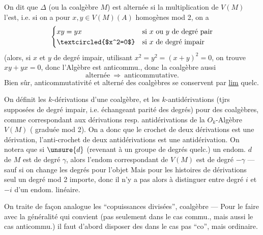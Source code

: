 On dit que $\Delta$ (ou la coalgèbre $M$) est alternée si la multiplication de $V(M)$ l'est, i.e. si on a pour  $x,y\in V(M)(A)$ homogènes mod 2, on a
\[
\begin{cases}
xy=yx&\text{si }x\text{ ou }y\text{ de degré pair}\\
\textcircled{$x^2=0$}&\text{si }x\text{ de degré impair}
\end{cases}
\]
(alors, si $x$ et $y$ de degré impair, utilisant $x^2=y^2=(x+y)^2=0$, on trouve $xy+yx=0$, donc l'Algèbre est anticommu., donc  la coalgèbre aussi
\[
\text{alternée}\ \Longrightarrow\ \text{anticommutative}.
\]
Bien sûr, anticommutativité et  alterné  des  coalgèbres se conservent par \uline{lim} quelc.

On définit les $k$-dérivations d'une coalgèbre, et les $k$-antidérivations (tjrs
supposées de degré impair, i.e. échangeant parité des degrés) pour des coalgèbres, comme correspondant aux dérivations resp. antidérivations de la $O_k$-Algèbre $V(M)$ ( graduée mod 2). On a donc que le crochet de deux dérivations est une dérivation, l'anti-crochet de deux antidérivations est une antidérivation. On notera que si $\unsure{d}$ (revenant à un groupe de degrés quelc.) un endom. $d$ de $M$ est de degré $\gamma$, alors l'endom correspondant de $V(M)$ est de degré $-\gamma$ --- sauf si on change les degrés  pour l'objet
\diagram{\[
\begin{array}{ll}
V(M_i)&=V(M)^i=V(M)_{-i}\\
\text{\textquotedbl}&\\
V(M^{-i})&
\end{array}
\]}
Mais pour les histoires de dérivations  seul un degré mod 2 importe, donc il n'y a pas alors à distinguer entre degré $i$ et $-i$ d'un endom. linéaire.

On traite de façon analogue les ``copuissances divisées'',  coalgèbre --- Pour le faire avec la généralité qui convient (pas seulement dans le cas commu., \deleted{\unsure{\&}} mais aussi le cas anticommu.) il faut d'abord disposer des  dans le cas pas ``co'', mais ordinaire.

